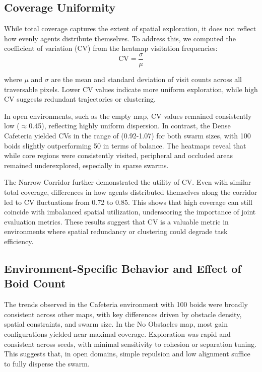 \documentclass[12pt]{article}
\begin{document}
\subsection{Coverage Uniformity}

While total coverage captures the extent of spatial exploration, it does not reflect how evenly agents distribute themselves. To address this, we computed the coefficient of variation (CV) from the heatmap visitation frequencies:
\[\text{CV} = \frac{\sigma}{\mu}\]

where \(\mu\) and \(\sigma\) are the mean and standard deviation of visit counts across all traversable pixels. Lower CV values indicate more uniform exploration, while high CV suggests redundant trajectories or clustering. 

In open environments, such as the empty map, CV values remained consistently low (\(\approx\)0.45), reflecting highly uniform dispersion. In contrast, the Dense Cafeteria yielded CVs in the range of (0.92-1.07) for both swarm sizes, with 100 boids slightly outperforming 50 in terms of balance. The heatmaps reveal that while core regions were consistently visited, peripheral and occluded areas remained underexplored, especially in sparse swarms.

The Narrow Corridor further demonstrated the utility of CV. Even with similar total coverage, differences in how agents distributed themselves along the corridor led to CV fluctuations from 0.72 to 0.85. This shows that high coverage can still coincide with imbalanced spatial utilization, underscoring the importance of joint evaluation metrics. These results suggest that CV is a valuable metric in environments where spatial redundancy or clustering could degrade task efficiency.

\subsection{Environment-Specific Behavior and Effect of Boid Count}

The trends observed in the Cafeteria environment with 100 boids were broadly consistent across other maps, with key differences driven by obstacle density, spatial constraints, and swarm size. In the No Obstacles map, most gain configurations yielded near-maximal coverage. Exploration was rapid and consistent across seeds, with minimal sensitivity to cohesion or separation tuning. This suggests that, in open domains, simple repulsion and low alignment suffice to fully disperse the swarm.
\end{document}

